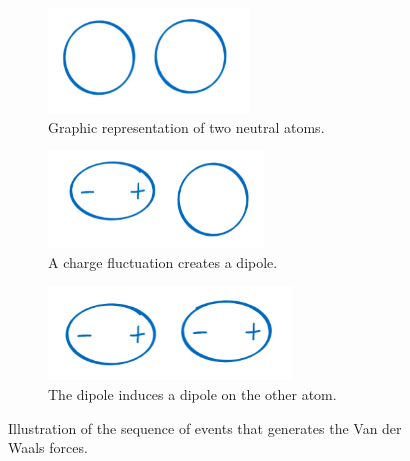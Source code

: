 \begin{figure}
    \centering
    \begin{subfigure}[t]{0.25\textwidth}
    \includegraphics[width=\textwidth]{Figures/Chapter2/vdw1.png}
    \caption{Graphic representation of two neutral atoms.}
    \label{fig:vdw_1}
    \end{subfigure}
    \hspace{0.5cm}
    \begin{subfigure}[t]{0.25\textwidth}
    \includegraphics[width=\textwidth]{Figures/Chapter2/vdw2.png}
    \caption{A charge fluctuation creates a dipole.}
    \label{fig:vdw_2}
    \end{subfigure}
    \hspace{0.5cm}
    \begin{subfigure}[t]{0.25\textwidth}
    \includegraphics[width=\textwidth]{Figures/Chapter2/vdw3.png}
    \caption{The dipole induces a dipole on the other atom.}
    \label{fig:vdw_3}
    \end{subfigure}
   
    \caption{Illustration of the sequence of events that generates the Van der Waals forces.}
    \label{fig:van_der_waals}
\end{figure}

